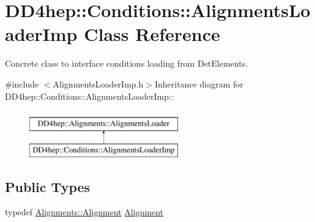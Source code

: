 \hypertarget{class_d_d4hep_1_1_conditions_1_1_alignments_loader_imp}{
\section{DD4hep::Conditions::AlignmentsLoaderImp Class Reference}
\label{class_d_d4hep_1_1_conditions_1_1_alignments_loader_imp}
}


Concrete class to interface conditions loading from DetElements.  


{\ttfamily \#include $<$AlignmentsLoaderImp.h$>$}Inheritance diagram for DD4hep::Conditions::AlignmentsLoaderImp::\begin{figure}[H]
\begin{center}
\leavevmode
\includegraphics[height=2cm]{class_d_d4hep_1_1_conditions_1_1_alignments_loader_imp}
\end{center}
\end{figure}
\subsection*{Public Types}
\begin{DoxyCompactItemize}
\item 
typedef \hyperlink{class_d_d4hep_1_1_alignments_1_1_alignment}{Alignments::Alignment} \hyperlink{class_d_d4hep_1_1_conditions_1_1_alignments_loader_imp_a2af19e971736ac6856523194f7eb717a}{Alignment}
\end{DoxyCompactItemize}
